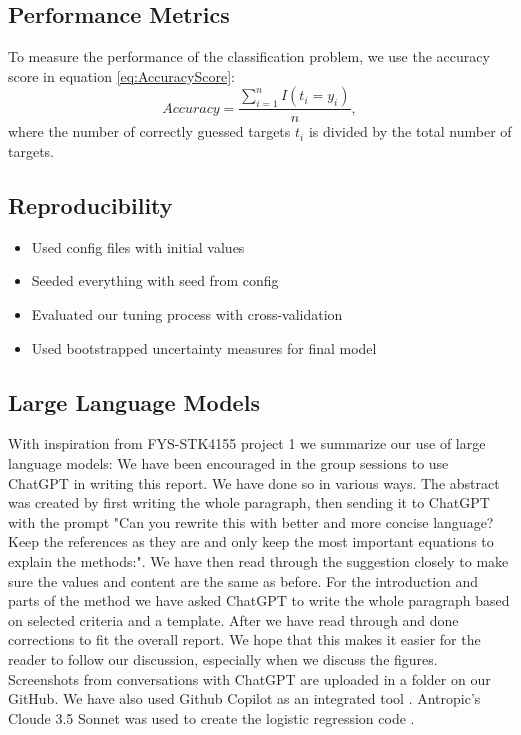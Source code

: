 \subsection{Performance Metrics}

To measure the performance of the classification problem, we use the accuracy score in equation \ref{eq:AccuracyScore}: \begin{equation}
    Accuracy = \frac{\sum_{i=1}^n I(t_i = y_i)}{n},
    \label{eq:AccuracyScore}
\end{equation}
where the number of correctly guessed targets $t_i$ is divided by the total number of targets.

\subsection{Reproducibility}
\begin{itemize}
    \item Used config files with initial values
    \item Seeded everything with seed from config
    \item Evaluated our tuning process with cross-validation
    \item Used bootstrapped uncertainty measures for final model
\end{itemize}
\subsection{Large Language Models}

With inspiration from FYS-STK4155 project 1 \cite{bore2023fysstk4155project1} we summarize our use of large language models: 
We have been encouraged in the group sessions to use ChatGPT \cite{openai2023chatgpt} in writing this report. We have done so in various ways. The abstract was created by first writing the whole paragraph, then sending it to ChatGPT with the prompt "Can you rewrite this with better and more concise language? Keep the references as they are and only keep the most important equations to explain the methods:". We have then read through the suggestion closely to make sure the values and content are the same as before. For the introduction and parts of the method we have asked ChatGPT to write the whole paragraph based on selected criteria and a template. After we have read through and done corrections to fit the overall report. We hope that this makes it easier for the reader to follow our discussion, especially when we discuss the figures. Screenshots from conversations with ChatGPT are uploaded in a folder on our GitHub. We have also used Github Copilot as an integrated tool \cite{github_copilot}. Antropic's Cloude 3.5 Sonnet was used to create the logistic regression code \cite{anthropic_claude_3_5_sonnet}. 


